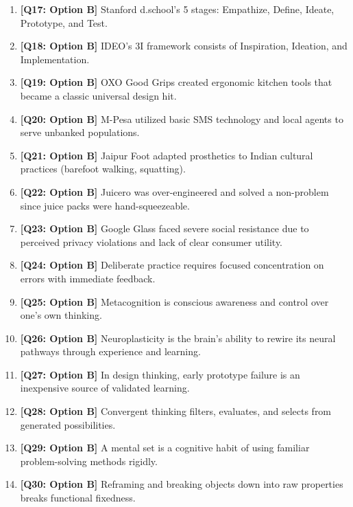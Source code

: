 \begin{expbox}
\begin{enumerate}[leftmargin=6mm, itemsep=2.5mm]
  \item \textbf{[Q17: Option B]} Stanford d.school's 5 stages: Empathize, Define, Ideate, Prototype, and Test.
  \item \textbf{[Q18: Option B]} IDEO's 3I framework consists of Inspiration, Ideation, and Implementation.
  \item \textbf{[Q19: Option B]} OXO Good Grips created ergonomic kitchen tools that became a classic universal design hit.
  \item \textbf{[Q20: Option B]} M-Pesa utilized basic SMS technology and local agents to serve unbanked populations.
  \item \textbf{[Q21: Option B]} Jaipur Foot adapted prosthetics to Indian cultural practices (barefoot walking, squatting).
  \item \textbf{[Q22: Option B]} Juicero was over-engineered and solved a non-problem since juice packs were hand-squeezeable.
  \item \textbf{[Q23: Option B]} Google Glass faced severe social resistance due to perceived privacy violations and lack of clear consumer utility.
  \item \textbf{[Q24: Option B]} Deliberate practice requires focused concentration on errors with immediate feedback.
  \item \textbf{[Q25: Option B]} Metacognition is conscious awareness and control over one's own thinking.
  \item \textbf{[Q26: Option B]} Neuroplasticity is the brain's ability to rewire its neural pathways through experience and learning.
  \item \textbf{[Q27: Option B]} In design thinking, early prototype failure is an inexpensive source of validated learning.
  \item \textbf{[Q28: Option B]} Convergent thinking filters, evaluates, and selects from generated possibilities.
  \item \textbf{[Q29: Option B]} A mental set is a cognitive habit of using familiar problem-solving methods rigidly.
  \item \textbf{[Q30: Option B]} Reframing and breaking objects down into raw properties breaks functional fixedness.
\end{enumerate}
\end{expbox}
